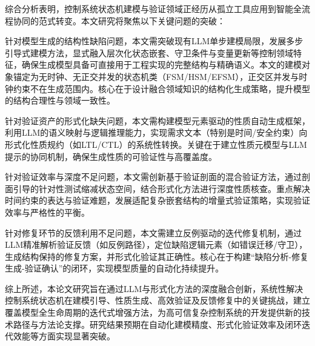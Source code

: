 综合分析表明，控制系统状态机建模与验证领域正经历从孤立工具应用到智能全流程协同的范式转变。本文研究将聚焦以下关键问题的突破：

针对模型生成的结构性缺陷问题，本文需突破现有LLM单步建模局限，发展多步引导式建模方法，显式融入层次化状态嵌套、守卫条件与变量更新等控制领域特征，确保生成模型具备可直接用于工程实现的完整结构与精确语义。本文的建模对象锚定为无时钟、无正交并发的状态机类（FSM/HSM/EFSM），正交区并发与时钟约束不在生成范围内。核心在于设计融合领域知识的结构化生成策略，提升模型的结构合理性与领域一致性。

针对验证资产的形式化缺失问题，本文需构建模型元素驱动的性质自动生成框架，利用LLM的语义映射与逻辑推理能力，实现需求文本（特别是时间/安全约束）向形式化性质规约（如LTL/CTL）的系统性转换。关键在于建立性质元模型与LLM提示的协同机制，确保生成性质的可验证性与高覆盖度。

针对验证效率与深度不足问题，本文需创新基于验证剖面的混合验证方法，通过剖面引导的针对性测试缩减状态空间，结合形式化方法进行深度性质核查。重点解决时间约束的表达与验证难题，发展适配复杂嵌套结构的增量式验证策略，实现验证效率与严格性的平衡。

针对修复环节的反馈利用不足问题，本文需建立反例驱动的迭代修复机制，通过LLM精准解析验证反馈（如反例路径），定位缺陷逻辑元素（如错误迁移/守卫），生成结构保持的修复方案，并形式化验证其正确性。核心在于构建“缺陷分析-修复生成-验证确认”的闭环，实现模型质量的自动化持续提升。

综上所述，本论文研究旨在通过LLM与形式化方法的深度融合创新，系统性解决控制系统状态机在建模引导、性质生成、高效验证及反馈修复中的关键挑战，建立覆盖模型全生命周期的迭代式增强方法，为高可信复杂控制系统的开发提供新的技术路径与方法论支撑。研究结果预期在自动化建模精度、形式化验证效率及闭环迭代效能等方面实现显著突破。

